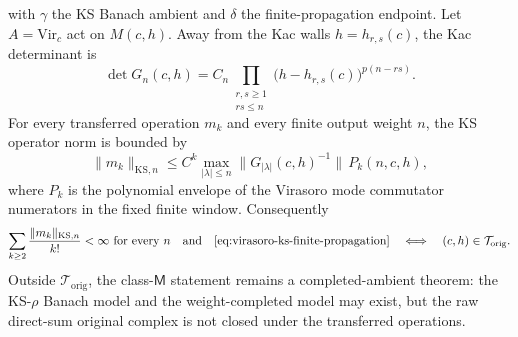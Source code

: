 \begin{theorem}
\label{thm:virasoro-ks-original-complex-criterion}
\ClaimStatusConditional{} with \(\gamma\) the KS Banach ambient and
\(\delta\) the finite-propagation endpoint.
Let \(A=\mathrm{Vir}_c\) act on \(M(c,h)\). Away from the Kac walls
\(h=h_{r,s}(c)\), the Kac determinant is
\begin{equation}
\label{eq:virasoro-ks-kac-determinant}
\det G_n(c,h)
=
C_n\prod_{\substack{r,s\ge1\\rs\le n}}
\bigl(h-h_{r,s}(c)\bigr)^{p(n-rs)}.
\end{equation}
For every transferred operation \(m_k\) and every finite output weight
\(n\), the KS operator norm is bounded by
\begin{equation}
\label{eq:virasoro-ks-mk-norm-bound}
\|m_k\|_{\mathrm{KS},n}
\le
C^k
\max_{|\lambda|\le n}\|G_{|\lambda|}(c,h)^{-1}\|\,
P_k(n,c,h),
\end{equation}
where \(P_k\) is the polynomial envelope of the Virasoro mode
commutator numerators in the fixed finite window. Consequently
\begin{equation}
\label{eq:virasoro-ks-original-criterion}
\sum_{k\ge2}\frac{\|m_k\|_{\mathrm{KS},n}}{k!}<\infty
\ \text{for every }n
\quad\text{and}\quad
\eqref{eq:virasoro-ks-finite-propagation}
\quad\Longleftrightarrow\quad
(c,h)\in\mathcal T_{\mathrm{orig}}.
\end{equation}
Outside \(\mathcal T_{\mathrm{orig}}\), the class-\(\mathsf M\)
statement remains a completed-ambient theorem: the KS-\(\rho\) Banach
model and the weight-completed model may exist, but the raw direct-sum
original complex is not closed under the transferred operations.
\end{theorem}

